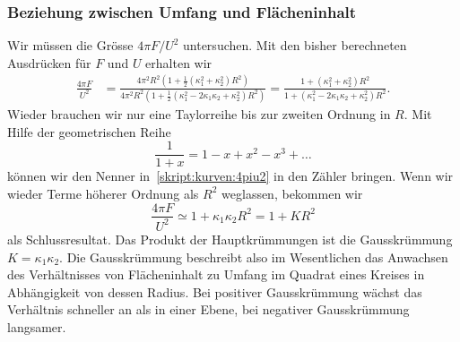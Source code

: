 \subsubsection{Beziehung zwischen Umfang und Flächeninhalt}
Wir müssen die Grösse $4\pi F/U^2$ untersuchen.
Mit den bisher berechneten Ausdrücken für $F$ und $U$ erhalten wir
\begin{align}
\frac{4\pi F}{U^2}
&=
\frac{4\pi^2R^2(1+{\textstyle\frac12}(\kappa_1^2 + \kappa_2^2)R^2)}%
{4\pi^2 R^2(1+{\textstyle\frac12}(\kappa_1^2-2\kappa_1\kappa_2+\kappa_2^2)R^2)}
=
\frac{1+(\kappa_1^2 + \kappa_2^2)R^2}%
{1+(\kappa_1^2-2\kappa_1\kappa_2+\kappa_2^2)R^2}.
\label{skript:kurven:4piu2}
\end{align}
Wieder brauchen wir nur eine Taylorreihe bis zur zweiten Ordnung in $R$.
Mit Hilfe der geometrischen Reihe 
\[
\frac1{1+x}= 1-x+x^2-x^3+\dots
\]
können wir den Nenner in~\eqref{skript:kurven:4piu2} in den Zähler
bringen.
Wenn wir wieder Terme höherer Ordnung als $R^2$ weglassen, bekommen
wir 
\begin{equation}
\frac{4\pi F}{U^2}
\simeq
1+\kappa_1\kappa_2R^2
=
1 + KR^2
\end{equation}
als Schlussresultat.
Das Produkt der Hauptkrümmungen ist die Gausskrümmung $K=\kappa_1\kappa_2$.
Die Gausskrümmung beschreibt also im Wesentlichen das Anwachsen des
Verhältnisses von Flächeninhalt zu Umfang im Quadrat eines Kreises
in Abhängigkeit von dessen Radius.
Bei positiver Gauss\-krümmung wächst das Verhältnis schneller an
als in einer Ebene, bei negativer Gausskrümmung langsamer.





